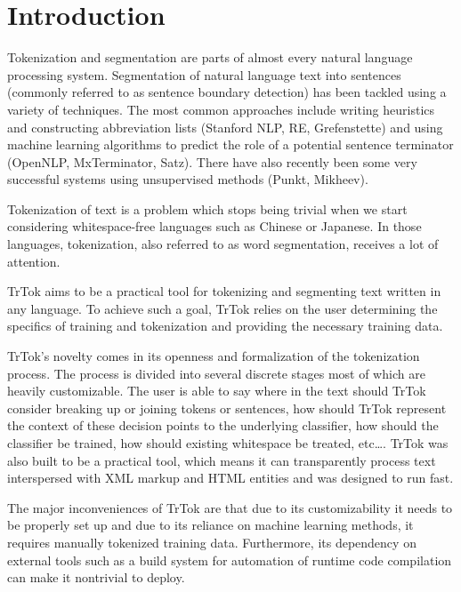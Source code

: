 \section{Introduction}
\label{sec:introduction}

Tokenization and segmentation are parts of almost every natural
language processing system. Segmentation of natural language text into
sentences (commonly referred to as sentence boundary detection) has
been tackled using a variety of techniques. The most common approaches
include writing heuristics and constructing abbreviation lists
(Stanford NLP, RE, Grefenstette) and using machine learning algorithms
to predict the role of a potential sentence terminator (OpenNLP,
MxTerminator, Satz). There have also recently been some very
successful systems using unsupervised methods (Punkt, Mikheev).

Tokenization of text is a problem which stops being trivial when we
start considering whitespace-free languages such as Chinese or
Japanese. In those languages, tokenization, also referred to as word
segmentation, receives a lot of attention.

TrTok aims to be a practical tool for tokenizing and segmenting text
written in any language. To achieve such a goal, TrTok relies on the
user determining the specifics of training and tokenization and
providing the necessary training data.

TrTok's novelty comes in its openness and formalization of the
tokenization process. The process is divided into several discrete
stages most of which are heavily customizable. The user is able to say
where in the text should TrTok consider breaking up or joining tokens
or sentences, how should TrTok represent the context of these decision
points to the underlying classifier, how should the classifier be
trained, how should existing whitespace be treated, etc\ldots. TrTok
was also built to be a practical tool, which means it can
transparently process text interspersed with XML markup and HTML
entities and was designed to run fast.

The major inconveniences of TrTok are that due to its customizability
it needs to be properly set up and due to its reliance on machine
learning methods, it requires manually tokenized training data.
Furthermore, its dependency on external tools such as a build system
for automation of runtime code compilation can make it nontrivial to
deploy.
